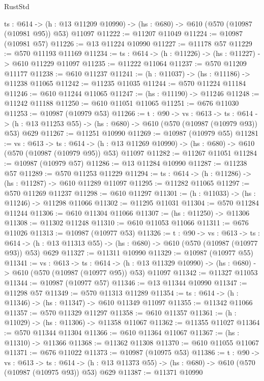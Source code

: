\begin{lexlean}{RustStd}
\begin{coremodule}
  {ts : @614} ->
  (h : @13 @11209 @10990) -> (hs : @680) -> @610 (@570 (@10987 (@10981 @95)) @53) @11097
@11222 := @11207 @11049
@11224 := @10987 (@10981 @57)
@11226 := @13 @11224 @10990
@11227 := @11178 @57
@11229 := @570 @11193 @11169
@11234 := {ts : @614} -> (h : @11226) -> (hs : @11227) -> @610 @11229 @11097
@11235 := @11222 @11064
@11237 := @570 @11209 @11177
@11238 := @610 @11237
@11241 := (h : @11037) -> (hs : @11186) -> @11238 @11065
@11242 := @11235 @11035
@11244 := @570 @11224 @11184
@11246 := @610 @11244 @11065
@11247 := (hs : @11190) -> @11246
@11248 := @11242 @11188
@11250 := @610 @11051 @11065
@11251 := @676 @11030
@11253 := @10987 (@10979 @53)
@11266 := {t : @90} ->
  {vs : @613} ->
  {ts : @614} -> (h : @13 @11253 @55) -> (hs : @680) -> @610 (@570 (@10987 (@10979 @93)) @53) @629
@11267 := @11251 @10990
@11269 := @10987 (@10979 @55)
@11281 := {vs : @613} ->
  {ts : @614} ->
  (h : @13 @11269 @10990) -> (hs : @680) -> @610 (@570 (@10987 (@10979 @95)) @53) @11097
@11282 := @11267 @11051
@11284 := @10987 (@10979 @57)
@11286 := @13 @11284 @10990
@11287 := @11238 @57
@11289 := @570 @11253 @11229
@11294 := {ts : @614} -> (h : @11286) -> (hs : @11287) -> @610 @11289 @11097
@11295 := @11282 @11065
@11297 := @570 @11269 @11237
@11298 := @610 @11297
@11301 := (h : @11033) -> (hs : @11246) -> @11298 @11066
@11302 := @11295 @11031
@11304 := @570 @11284 @11244
@11306 := @610 @11304 @11066
@11307 := (hs : @11250) -> @11306
@11308 := @11302 @11248
@11310 := @610 @11053 @11066
@11311 := @676 @11026
@11313 := @10987 (@10977 @53)
@11326 := {t : @90} ->
  {vs : @613} ->
  {ts : @614} -> (h : @13 @11313 @55) -> (hs : @680) -> @610 (@570 (@10987 (@10977 @93)) @53) @629
@11327 := @11311 @10990
@11329 := @10987 (@10977 @55)
@11341 := {vs : @613} ->
  {ts : @614} ->
  (h : @13 @11329 @10990) -> (hs : @680) -> @610 (@570 (@10987 (@10977 @95)) @53) @11097
@11342 := @11327 @11053
@11344 := @10987 (@10977 @57)
@11346 := @13 @11344 @10990
@11347 := @11298 @57
@11349 := @570 @11313 @11289
@11354 := {ts : @614} -> (h : @11346) -> (hs : @11347) -> @610 @11349 @11097
@11355 := @11342 @11066
@11357 := @570 @11329 @11297
@11358 := @610 @11357
@11361 := (h : @11029) -> (hs : @11306) -> @11358 @11067
@11362 := @11355 @11027
@11364 := @570 @11344 @11304
@11366 := @610 @11364 @11067
@11367 := (hs : @11310) -> @11366
@11368 := @11362 @11308
@11370 := @610 @11055 @11067
@11371 := @676 @11022
@11373 := @10987 (@10975 @53)
@11386 := {t : @90} ->
  {vs : @613} ->
  {ts : @614} -> (h : @13 @11373 @55) -> (hs : @680) -> @610 (@570 (@10987 (@10975 @93)) @53) @629
@11387 := @11371 @10990

\end{coremodule}
\end{lexlean}
